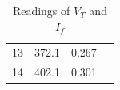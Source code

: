 \documentclass[a4paper,12pt]{article}
\begin{document}
\begin{table}[H]
\begin{subtable}[t]{0.45\textwidth}
\begin{tabular}{|c|c|c|c|}
			13                                                         & 372.1                                                                            & 0.267                                                                        &                                                                \\ \cline{1-3}
			14                                                         & 402.1                                                                            & 0.301                                                                        &                                                                \\ \hline
		\end{tabular}
		\caption{Readings of $V_T$ and $I_f$}
			\vspace{1cm}
	\end{subtable}


\end{table}
\end{document}
